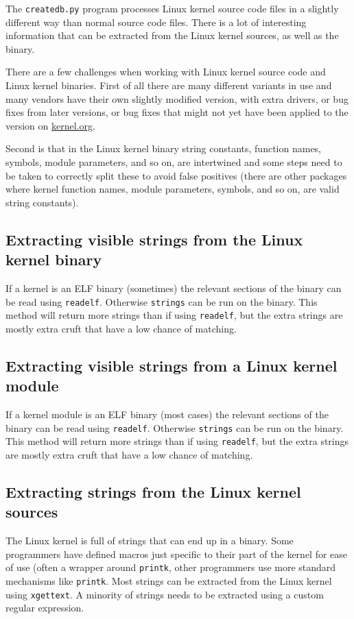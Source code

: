 \documentclass[10pt,a4paper]{article}
\begin{document}
The \texttt{createdb.py} program processes Linux kernel source code files in a
slightly different way than normal source code files. There is a lot of
interesting information that can be extracted from the Linux kernel sources,
as well as the binary.

There are a few challenges when working with Linux kernel source code and Linux
kernel binaries. First of all there are many different variants in use and many
vendors have their own slightly modified version, with extra drivers, or bug
fixes from later versions, or bug fixes that might not yet have been applied to
the version on \url{kernel.org}.

Second is that in the Linux kernel binary string constants, function names,
symbols, module parameters, and so on, are intertwined and some steps need to
be taken to correctly split these to avoid false positives (there are other
packages where kernel function names, module parameters, symbols, and so on,
are valid string constants).

\subsection{Extracting visible strings from the Linux kernel binary}

If a kernel is an ELF binary (sometimes) the relevant sections of the
binary can be read using \texttt{readelf}. Otherwise \texttt{strings} can be
run on the binary. This method will return more strings than if using
\texttt{readelf}, but the extra strings are mostly extra cruft that have a low
chance of matching.

\subsection{Extracting visible strings from a Linux kernel module}

If a kernel module is an ELF binary (most cases) the relevant sections of the
binary can be read using \texttt{readelf}. Otherwise \texttt{strings} can be
run on the binary. This method will return more strings than if using
\texttt{readelf}, but the extra strings are mostly extra cruft that have a low
chance of matching.

\subsection{Extracting strings from the Linux kernel sources}

The Linux kernel is full of strings that can end up in a binary. Some
programmers have defined macros just specific to their part of the kernel for
ease of use (often a wrapper around \texttt{printk}, other programmers use
more standard mechanisms like \texttt{printk}. Most strings can be extracted
from the Linux kernel using \texttt{xgettext}. A minority of strings needs to
be extracted using a custom regular expression.
\end{document}
